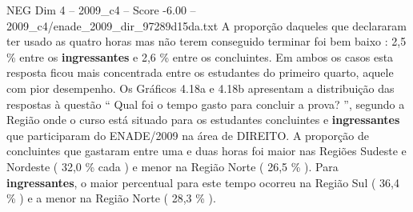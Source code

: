 \begin{textsample}{NEG Dim 4 – 2009\_c4 – Score -6.00 – 2009\_c4/enade\_2009\_dir\_97289d15da.txt}
A proporção daqueles que declararam ter usado as quatro horas mas não terem conseguido terminar foi bem baixo : 2,5 \% entre os \textbf{ingressantes} e 2,6 \% entre os concluintes.
Em ambos os casos esta resposta ficou mais concentrada entre os estudantes do primeiro quarto, aquele com pior desempenho.
Os Gráficos 4.18a e 4.18b apresentam a distribuição das respostas à questão “ Qual foi o tempo gasto para concluir a prova? ”, segundo a Região onde o curso está situado para os estudantes concluintes e \textbf{ingressantes} que participaram do ENADE/2009 na área de DIREITO.
A proporção de concluintes que gastaram entre uma e duas horas foi maior nas Regiões Sudeste e Nordeste ( 32,0 \% cada ) e menor na Região Norte ( 26,5 \% ).
Para \textbf{ingressantes}, o maior percentual para este tempo ocorreu na Região Sul ( 36,4 \% ) e a menor na Região Norte ( 28,3 \% ).

\end{textsample}
